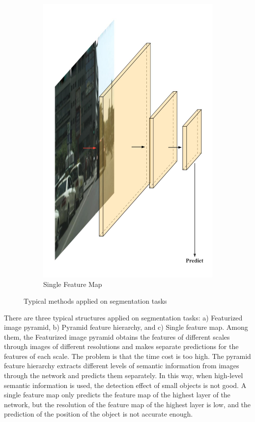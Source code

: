 \begin{figure}[htbp]
\begin{subfigure}[t]{0.3\linewidth}
        \includegraphics[width=1\textwidth]{figures/fcnarch3.png}
        \caption{Single Feature Map}\label{FCNarch3}
    \end{subfigure}
    \caption{Typical methods applied on segmentation tasks}\label{FCNarch}
\end{figure}


There are three typical structures applied on segmentation tasks: a) Featurized image pyramid, b) Pyramid feature hierarchy, and c) Single feature map. Among them, the Featurized image pyramid obtains the features of different scales through images of different resolutions and makes separate predictions for the features of each scale. The problem is that the time cost is too high. The pyramid feature hierarchy extracts different levels of semantic information from images through the network and predicts them separately. In this way, when high-level semantic information is used, the detection effect of small objects is not good. A single feature map only predicts the feature map of the highest layer of the network, but the resolution of the feature map of the highest layer is low, and the prediction of the position of the object is not accurate enough.

